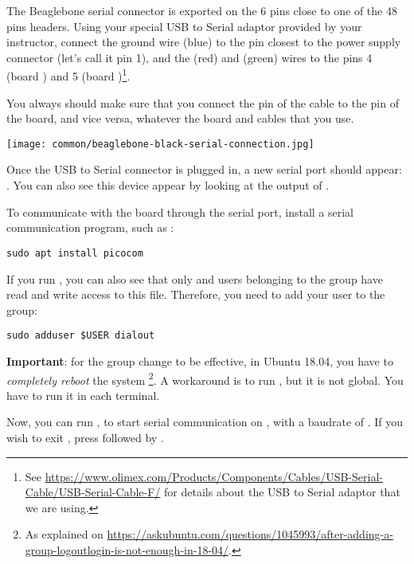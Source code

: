 The Beaglebone serial connector is exported on the 6 pins close to one
of the 48 pins headers. Using your special USB to Serial adaptor provided
by your instructor, connect the ground wire (blue) to the pin closest
to the power supply connector (let's call it pin 1), and the  (red)
and  (green) wires to the pins 4 (board ) and
5 (board )\footnote{See
\url{https://www.olimex.com/Products/Components/Cables/USB-Serial-Cable/USB-Serial-Cable-F/}
for details about the USB to Serial adaptor that we are using.}.

You always should make sure that you connect the  pin of the cable
to the  pin of the board, and vice versa, whatever the board and
cables that you use.

\begin{center}
\texttt{[image: common/beaglebone-black-serial-connection.jpg]}
\end{center}

Once the USB to Serial connector is plugged in, a new serial port
should appear: .  You can also see this device
appear by looking at the output of .

To communicate with the board through the serial port, install a
serial communication program, such as :

\begin{verbatim}
sudo apt install picocom
\end{verbatim}

If you run , you can also see that only
 and users belonging to the  group have
read and write access to this file. Therefore, you need to add your user
to the  group:

\begin{verbatim}
sudo adduser $USER dialout
\end{verbatim}

{\bf Important}: for the group change to be effective, in Ubuntu 18.04, you have to
{\em completely reboot} the system \footnote{As explained on
\url{https://askubuntu.com/questions/1045993/after-adding-a-group-logoutlogin-is-not-enough-in-18-04/}.}.
A workaround is to run , but it is not global.
You have to run it in each terminal.

Now, you can run , to start serial
communication on , with a baudrate of . If
you wish to exit , press \code{[Ctrl][a]} followed by
\code{[Ctrl][x]}.

